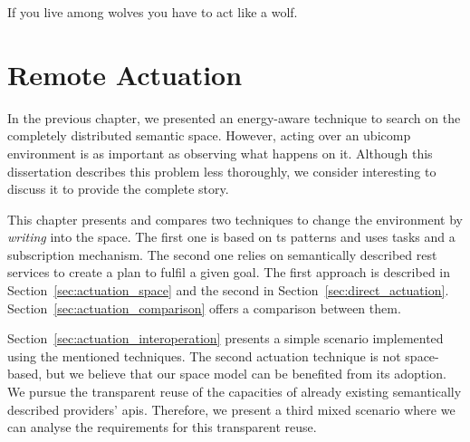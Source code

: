 
\begin{savequote}[50mm]
If you live among wolves you have to act like a wolf.
\end{savequote}


\chapter{Remote Actuation}
\label{cha:actuate}


\newcommand{\restdesc}{\emph{RESTdesc}}



\ifpdf
    \graphicspath{{\pathchapsix/figures/PNG/}{\pathchapsix/figures/PDF/}{\pathchapsix/figures/JPG/}{\pathchapsix/figures/}}
\else
    \graphicspath{{\pathchapsix/figures/EPS/}{\pathchapsix/figures/}}
\fi



In the previous chapter, we presented an energy-aware technique to search on the completely distributed semantic space.
However, acting over an \ac{ubicomp} environment is as important as observing what happens on it.
Although this dissertation describes this problem less thoroughly, we consider interesting to discuss it to provide the complete story. %


This chapter presents and compares two techniques to change the environment by \emph{writing} into the space. %
The first one is based on \ac{ts} patterns and uses tasks and a subscription mechanism.
The second one relies on semantically described \ac{rest} services to create a plan to fulfil a given goal.
The first approach is described in Section~\ref{sec:actuation_space} and the second in Section~\ref{sec:direct_actuation}.
Section~\ref{sec:actuation_comparison} offers a comparison between them.


Section~\ref{sec:actuation_interoperation} presents a simple scenario implemented using the mentioned techniques.
The second actuation technique is not space-based, but we believe that our space model can be benefited from its adoption.
We pursue the transparent reuse of the capacities of already existing semantically described providers' \acsp{api}.
Therefore, we present a third mixed scenario where we can analyse the requirements for this transparent reuse.


